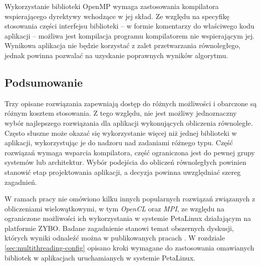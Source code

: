 Wykorzystanie biblioteki OpenMP wymaga zastosowania kompilatora wspierającego dyrektywy wchodzące w jej skład. 
Ze względu na specyfikę stosowania części interfejsu biblioteki -- w formie komentarzy do właściwego kodu aplikacji -- możliwa jest kompilacja programu kompilatorem nie wspierającym jej. 
Wynikowa aplikacja nie będzie korzystać z zalet przetwarzania równoległego, jednak powinna pozwalać na uzyskanie poprawnych wyników algorytmu.

\subsection*{Podsumowanie}

Trzy opisane rozwiązania zapewniają dostęp do różnych możliwości i obarczone są różnym kosztem stosowania. 
Z tego względu, nie jest możliwy jednoznaczny wybór najlepszego rozwiązania dla aplikacji wykonujących obliczenia równoległe. 
Często słuszne może okazać się wykorzystanie więcej niż jednej biblioteki w aplikacji, wykorzystując je do nadzoru nad zadaniami różnego typu. 
Część rozwiązań wymaga wsparcia kompilatora, część ograniczona jest do pewnej grupy systemów lub architektur. 
Wybór podejścia do obliczeń równoległych powinien stanowić etap projektowania aplikacji, a decyzja powinna uwzględniać szereg zagadnień.

W ramach pracy nie omówiono kilku innych popularnych rozwiązań związanych z obliczeniami wielowątkowymi, w tym \emph{OpenCL} oraz \emph{MPI}, ze względu na ograniczone możliwości ich wykorzystania w systemie PetaLinux działającym na platformie ZYBO.
Badane zagadnienie stanowi temat obszernych dyskusji, których wyniki odnaleźć można w publikowanych pracach \cite{choosing-thread-framework,Kegel2009}. 
W rozdziale \ref{sec:multithreading-config} opisano kroki wymagane do zastosowania omawianych bibliotek w aplikacjach uruchamianych w systemie PetaLinux.


